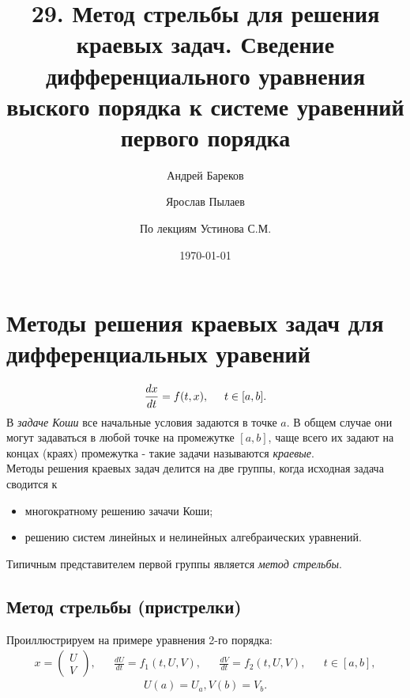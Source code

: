 \documentclass[a4paper,11pt]{article}
\title{29. Метод стрельбы для решения краевых задач. Сведение дифференциального уравнения выского порядка
      к системе уравенний первого порядка}
\author{Андрей Бареков \and Ярослав Пылаев \and По лекциям Устинова С.М.}
\date{\today}
\begin{document}
\maketitle
\newpage

\section{Методы решения краевых задач для дифференциальных уравений}
\begin{equation*}
  \frac{dx}{dt} = f(t, x), \hspace{5mm} t \in [a, b].
\end{equation*}
В \textit{задаче Коши} все начальные условия задаются в точке $a$. В общем случае они могут задаваться в любой точке
на промежутке $[a, b]$, чаще всего их задают на концах (краях) промежутка - такие задачи называются \textit{краевые}. \\

\noindent Методы решения краевых задач делится на две группы, когда исходная задача сводится к
\begin{itemize}
  \item многократному решению зачачи Коши;
  \item решению систем линейных и нелинейных алгебраических уравнений.
\end{itemize}

\noindent Типичным представителем первой группы является \textit{метод стрельбы}.

\subsection{Метод стрельбы (пристрелки)}
Проиллюстрируем на примере уравнения 2-го порядка:
\begin{align*}
  x = \begin{pmatrix} U \\ V \end{pmatrix}, && \frac{dU}{dt} = f_1(t, U, V), && \frac{dV}{dt} = f_2(t, U, V), && t \in [a, b],
\end{align*}
\begin{equation*}
  U(a)=U_a, V(b)=V_b.
\end{equation*}
\end{document}
